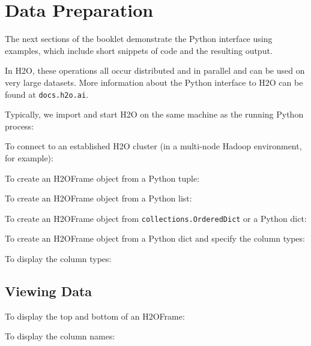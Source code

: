 {\section{Data Preparation}
The next sections of the booklet demonstrate the Python interface using examples, which include  short snippets of code and the
resulting output.  

In H2O, these operations all occur distributed and in
parallel and can be used on very large datasets.  More information about the
Python interface to H2O can be found at {\texttt{docs.h2o.ai}}.

Typically, we import and start H2O on the same machine as the running Python process:


To connect to an established H2O cluster (in a multi-node Hadoop environment, for example):


To create an H2OFrame object from a Python tuple:


To create an H2OFrame object from a Python list:


\newpage

To create an H2OFrame object from  \texttt{collections.OrderedDict} or a Python dict:


To create an H2OFrame object from a Python dict and specify the column types:


To display the column types:


\newpage

\subsection{Viewing Data}
To display the top and bottom of an H2OFrame:



To display the column names:


}
